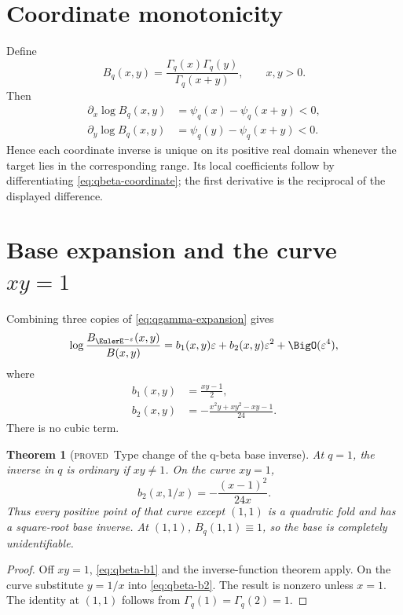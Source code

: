 \documentclass[11pt,letterpaper,oneside,openany]{book}
\newtheorem{theorem}{Theorem}[chapter]
\theoremstyle{definition}
\theoremstyle{remark}
\newcommand{\statusproved}{\textcolor{provedgreen}{\textsc{proved}}}
\begin{document}
\section{Coordinate monotonicity}
Define
\begin{equation}
 B_q(x,y)=\frac{\Gamma_q(x)\Gamma_q(y)}{\Gamma_q(x+y)},
 \qquad x,y>0.
 \label{eq:qbeta-def}
\end{equation}
Then
\begin{align}
 \partial_x\log B_q(x,y)&=\psi_q(x)-\psi_q(x+y)<0, \\
 \partial_y\log B_q(x,y)&=\psi_q(y)-\psi_q(x+y)<0.
 \label{eq:qbeta-coordinate}
\end{align}
Hence each coordinate inverse is unique on its positive real domain whenever
the target lies in the corresponding range.  Its local coefficients follow by
differentiating \cref{eq:qbeta-coordinate}; the first derivative is the
reciprocal of the displayed difference.

\section{Base expansion and the curve \(xy=1\)}
Combining three copies of \cref{eq:qgamma-expansion} gives
\begin{equation}
 \log\frac{B_{\EulerE^{-\varepsilon}}(x,y)}{B(x,y)}
 =b_1(x,y)\varepsilon+b_2(x,y)\varepsilon^2+\BigO(\varepsilon^4),
 \label{eq:qbeta-q1}
\end{equation}
where
\begin{align}
 b_1(x,y)&=\frac{xy-1}{2}, \label{eq:qbeta-b1}\\
 b_2(x,y)&=-\frac{x^2y+xy^2-xy-1}{24}.
 \label{eq:qbeta-b2}
\end{align}
There is no cubic term.

\begin{theorem}[\statusproved\ Type change of the q-beta base inverse]
At \(q=1\), the inverse in \(q\) is ordinary if \(xy\ne1\).  On the curve
\(xy=1\),
\begin{equation}
 b_2(x,1/x)=-\frac{(x-1)^2}{24x}.
 \label{eq:qbeta-critical-b2}
\end{equation}
Thus every positive point of that curve except \((1,1)\) is a quadratic fold
and has a square-root base inverse.  At \((1,1)\),
\(B_q(1,1)\equiv1\), so the base is completely unidentifiable.
\end{theorem}
\begin{proof}
Off \(xy=1\), \cref{eq:qbeta-b1} and the inverse-function theorem apply.  On
the curve substitute \(y=1/x\) into \cref{eq:qbeta-b2}.  The result is nonzero
unless \(x=1\).  The identity at \((1,1)\) follows from
\(\Gamma_q(1)=\Gamma_q(2)=1\).
\end{proof}
\end{document}
